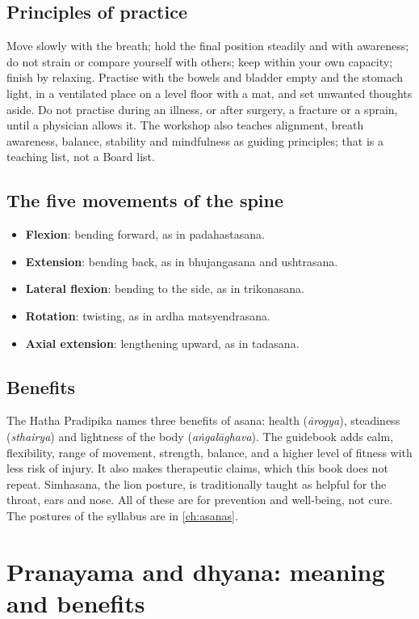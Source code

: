 \subsection*{Principles of practice}
Move slowly with the breath; hold the final position steadily and with awareness; do not strain or compare yourself with others; keep within your own capacity; finish by relaxing. Practise with the bowels and bladder empty and the stomach light, in a ventilated place on a level floor with a mat, and set unwanted thoughts aside. Do not practise during an illness, or after surgery, a fracture or a sprain, until a physician allows it. The workshop also teaches alignment, breath awareness, balance, stability and mindfulness as guiding principles; that is a teaching list, not a Board list.

\subsection*{The five movements of the spine}
\begin{itemize}
\item \textbf{Flexion}: bending forward, as in padahastasana.
\item \textbf{Extension}: bending back, as in bhujangasana and ushtrasana.
\item \textbf{Lateral flexion}: bending to the side, as in trikonasana.
\item \textbf{Rotation}: twisting, as in ardha matsyendrasana.
\item \textbf{Axial extension}: lengthening upward, as in tadasana.
\end{itemize}

\subsection*{Benefits}
The Hatha Pradipika names three benefits of asana: health (\emph{ārogya}), steadiness (\emph{sthairya}) and lightness of the body (\emph{aṅgalāghava}). The guidebook adds calm, flexibility, range of movement, strength, balance, and a higher level of fitness with less risk of injury. It also makes therapeutic claims, which this book does not repeat. Simhasana, the lion posture, is traditionally taught as helpful for the throat, ears and nose. All of these are for prevention and well-being, not cure. The postures of the syllabus are in \cref{ch:asanas}.

\section{Pranayama and dhyana: meaning and benefits}
\label{ch:pranayama-intro}

